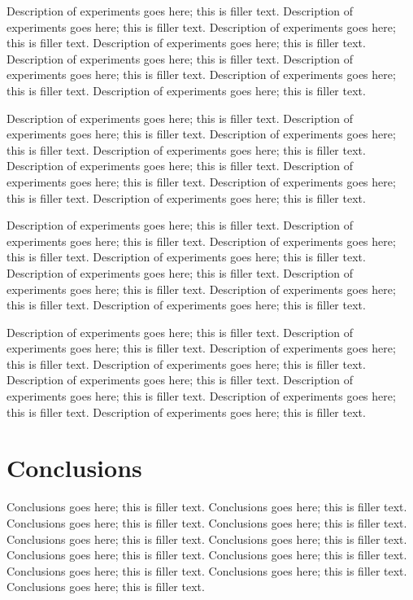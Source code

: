 \documentclass{sig-alternate}
\begin{document}
Description of experiments goes here; this is filler text. Description of experiments goes here; this is filler text. Description of experiments goes here; this is filler text. Description of experiments goes here; this is filler text. Description of experiments goes here; this is filler text. Description of experiments goes here; this is filler text. Description of experiments goes here; this is filler text. Description of experiments goes here; this is filler text.

Description of experiments goes here; this is filler text. Description of experiments goes here; this is filler text. Description of experiments goes here; this is filler text. Description of experiments goes here; this is filler text. Description of experiments goes here; this is filler text. Description of experiments goes here; this is filler text. Description of experiments goes here; this is filler text. Description of experiments goes here; this is filler text.

Description of experiments goes here; this is filler text. Description of experiments goes here; this is filler text. Description of experiments goes here; this is filler text. Description of experiments goes here; this is filler text. Description of experiments goes here; this is filler text. Description of experiments goes here; this is filler text. Description of experiments goes here; this is filler text. Description of experiments goes here; this is filler text.

Description of experiments goes here; this is filler text. Description of experiments goes here; this is filler text. Description of experiments goes here; this is filler text. Description of experiments goes here; this is filler text. Description of experiments goes here; this is filler text. Description of experiments goes here; this is filler text. Description of experiments goes here; this is filler text. Description of experiments goes here; this is filler text.

\section{Conclusions}

Conclusions goes here; this is filler text. Conclusions goes here; this is filler text. Conclusions goes here; this is filler text. Conclusions goes here; this is filler text. Conclusions goes here; this is filler text. Conclusions goes here; this is filler text. Conclusions goes here; this is filler text. Conclusions goes here; this is filler text. Conclusions goes here; this is filler text. Conclusions goes here; this is filler text. Conclusions goes here; this is filler text. 
\end{document}
